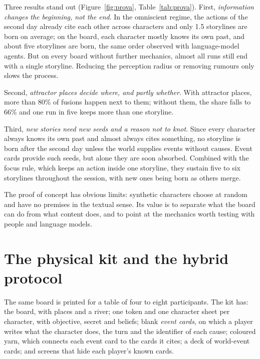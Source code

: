 \documentclass[11pt]{article}
\begin{document}
Three results stand out (Figure~\ref{fig:prova}, Table~\ref{tab:prova}).
First, \emph{information changes the beginning, not the end}. In the
omniscient regime, the actions of the second day already cite each other
across characters and only 1.5 storylines are born on average; on the board,
each character mostly knows its own past, and about five storylines are
born, the same order observed with language-model agents. But on every
board without further mechanics, almost all runs still end with a single
storyline. Reducing the perception radius or removing rumours only slows the
process.

Second, \emph{attractor places decide where, and partly whether}. With
attractor places, more than 80\% of fusions happen next to them; without
them, the share falls to 66\% and one run in five keeps more than one
storyline.

Third, \emph{new stories need new seeds and a reason not to knot}. Since
every character always knows its own past and almost always cites
something, no storyline is born after the second day unless the world
supplies events without causes. Event cards provide such seeds, but alone
they are soon absorbed. Combined with the focus rule, which keeps an action
inside one storyline, they sustain five to six storylines throughout the
session, with new ones being born as others merge.

The proof of concept has obvious limits: synthetic characters choose at
random and have no premises in the textual sense. Its value is to separate
what the board can do from what content does, and to point at the
mechanics worth testing with people and language models.

\section{The physical kit and the hybrid protocol}
\label{sec:kit}

The same board is printed for a table of four to eight participants. The kit
has: the board, with places and a river; one token and one character sheet
per character, with objective, secret and beliefs; blank \emph{event cards},
on which a player writes what the character does, the turn and the identifier
of each cause; coloured yarn, which connects each event card to the cards it
cites; a deck of world-event cards; and screens that hide each player's
known cards.
\end{document}
